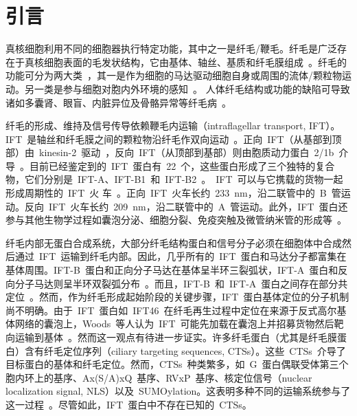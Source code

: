 \chapter{引\quad 言}
\renewcommand{\leftmark}{第一章\quad 引\quad 言}
真核细胞利用不同的细胞器执行特定功能，其中之一是纤毛/鞭毛。纤毛是广泛存在于真核细胞表面的毛发状结构，它由基体、轴丝、基质和纤毛膜组成\ \citep{Mizuno2012,Satir2007}。纤毛的功能可分为两大类\ \citep{Satir2007}，其一是作为细胞的马达驱动细胞自身或周围的流体/颗粒物运动。另一类是参与细胞对胞内外环境的感知\ \citep{Ishikawa2011,Mourao2016,Singla2006,Wood2015}。 人体纤毛结构或功能的缺陷可导致诸如多囊肾、眼盲、内脏异位及骨骼异常等纤毛病\ \citep{Fliegauf2007,Gerdes2009,Hildebrandt2011,Hildebrandt2007}。

纤毛的形成、维持及信号传导依赖鞭毛内运输（intraflagellar transport, IFT）\citep{Ishikawa2011,Mourao2016,Pedersen2008,Scholey2003}。IFT\ 是轴丝和纤毛膜之间的颗粒物沿纤毛作双向运动\ \citep{Kozminski1993}。正向\ IFT（从基部到顶部）由\ kinesin-2\ 驱动\ \citep{Kozminski1995,Miller2005,Ou2005,Pan2006,Snow2004,Walther1994}，反向\ IFT（从顶部到基部）则由胞质动力蛋白\ 2/1b\ 介导\ \citep{Hou2004,Pazour1999}。目前已经鉴定到的\ IFT\ 蛋白有\ 22\ 个，这些蛋白形成了三个独特的复合物，它们分别是\ IFT-A、IFT-B1\ 和\ IFT-B2\ \citep{Taschner2016,Taschner2016a}。\ IFT\ 可以与它携载的货物一起形成周期性的\ IFT\ 火
车\ \citep{Pigino2009,Stepanek2016,Vannuccini2016,Lechtreck2015,Lechtreck2017}。正向\ IFT\ 火车长约\ \SI{233}{\nm}，沿二联管中的\ B\ 管运动。反向\ IFT\ 火车长约\
\SI{209}{\nm}，沿二联管中的\ A\ 管运动\citep{Pigino2009,Stepanek2016,Vannuccini2016}。此外，IFT\ 蛋白还参与其他生物学过程如囊泡分泌、细胞分裂、免疫突触及微管纳米管的形成等\
\citep{Baldari2010,Borovina2013,Griffiths2010,Inaba2015,Wood2012,Fu2016}。

纤毛内部无蛋白合成系统，大部分纤毛结构蛋白和信号分子必须在细胞体中合成然后通过\ IFT\ 运输到纤毛内部。因此，几乎所有的\ IFT\ 蛋白和马达分子都富集在基体周围。IFT-B\ 蛋白和正向分子马达在基体呈半环三裂弧状，IFT-A\ 蛋白和反向分子马达则呈半环双裂弧分布\ \citep{Brown2015,Deane2001}。而且，IFT-B\ 和\ IFT-A\ 蛋白之间存在部分共定位\ \citep{Brown2015}。然而，作为纤毛形成起始阶段的关键步骤，IFT\ 蛋白基体定位的分子机制尚不明确。由于\ IFT\ 蛋白如\ IFT46\ 在纤毛再生过程中定位在来源于反式高尔基体网络的囊泡上，Woods\ 等人认为\ IFT\ 可能先加载在囊泡上并招募货物然后靶向运输到基体\
\citep{Wood2014}。然而这一观点有待进一步证实。许多纤毛蛋白（尤其是纤毛膜蛋白）含有纤毛定位序列（ciliary targeting sequences, CTSs）\citep{Bhogaraju2013,Malicki2014}。这些\ CTSs\ 介导了目标蛋白的基体和纤毛定位。然而，CTSs\ 种类繁多，如\ G\ 蛋白偶联受体第三个胞内环上的基序、Ax(S/A)xQ\ 基序、RVxP\ 基序、核定位信号（nuclear localization signal, NLS）以及\ SUMOylation。这表明多种不同的运输系统参与了这一过程\ \citep{Bhogaraju2013,Malicki2014,Dishinger2010,McIntyre2015}。尽管如此，IFT\ 蛋白中不存在已知的\ CTSs。

